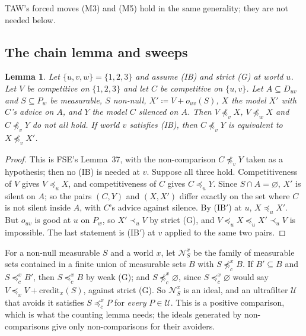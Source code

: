 \documentclass[11pt]{article}
\newtheorem{lemma}[theorem]{Lemma}
\theoremstyle{definition}\newtheorem{definition}[theorem]{Definition}
\theoremstyle{remark}\newtheorem{remark}[theorem]{Remark}
\newcommand{\cred}{\mathrm{credit}}
\newcommand{\Nid}{\mathcal N}
\newcommand{\Uf}{\mathcal U}
\begin{document}
TAW's forced moves (M3) and (M5) hold in the same generality; they are not
needed below.

\subsection{The chain lemma and sweeps}\label{sec:sweep}

\begin{lemma}\label{lem:chain}
Let $\{u,v,w\}=\{1,2,3\}$ and assume (IB) and strict (G) at world $u$. Let
$V$ be competitive on $\{1,2,3\}$ and let $C$ be competitive on $\{u,v\}$.
Let $A\subseteq D_{uv}$ and $S\subseteq P_w$ be measurable, $S$ non-null,
$X'\coloneqq V+o_{uv}(S)$, $X$ the model $X'$ with $C$'s advice on $A$, and
$Y$ the model $C$ silenced on $A$. Then $V\not\preceq_vX$,
$V\not\preceq_wX$ and $C\not\preceq_vY$ do not all hold. If world $v$
satisfies (IB), then $C\not\preceq_vY$ is equivalent to $X\not\preceq_vX'$.
\end{lemma}
\begin{proof}
This is FSE's Lemma~37, with the non-comparison
$C\not\preceq_vY$ taken as a hypothesis; then no (IB) is needed at $v$.
Suppose all three hold. Competitiveness of $V$ gives $V\preceq_uX$, and
competitiveness of $C$ gives $C\preceq_uY$. Since $S\cap A=\varnothing$,
$X'$ is silent on $A$; so the pairs $(C,Y)$ and $(X,X')$ differ exactly on
the set where $C$ is not silent inside $A$, with $C$'s advice against
silence. By (IB$'$) at $u$, $X\preceq_uX'$. But $o_{uv}$ is good at $u$ on
$P_w$, so $X'\prec_uV$ by strict (G), and $V\preceq_uX\preceq_uX'\prec_uV$
is impossible. The last statement is (IB$'$) at $v$ applied to the same two
pairs.
\end{proof}

For a non-null measurable $S$ and a world $x$, let $\Nid^x_S$ be the family
of measurable sets contained in a finite union of measurable sets $B$ with
$S\not\preceq^x_cB$. If $B'\subseteq B$ and $S\preceq^x_cB'$, then
$S\preceq^x_cB$ by weak (G); and $S\not\preceq^x_c\varnothing$, since
$S\preceq^x_c\varnothing$ would say $V\preceq_xV+\cred_x(S)$, against strict
(G). So $\Nid^x_S$ is an ideal, and an ultrafilter $\Uf$ that avoids it
satisfies $S\preceq^x_cP$ for \emph{every} $P\in\Uf$. This is a positive
comparison, which is what the counting lemma needs; the ideals generated
by non-comparisons give only non-comparisons for their avoiders.
\end{document}
